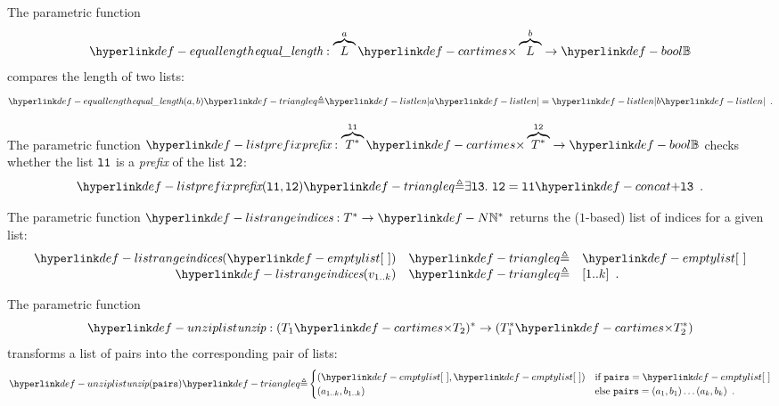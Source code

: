 \hypertarget{def-equallength}{}
\begin{definition}
The parametric function
\[
  \equallength : \overname{L}{a} \cartimes \overname{L}{b} \rightarrow \Bool
\]
compares the length of two lists:
\[
\equallength(a, b) \triangleq \listlen{a}=\listlen{b} \enspace.
\]
\end{definition}

\hypertarget{def-listprefix}{}
\begin{definition}
The parametric function $\listprefix : \overname{T^*}{\vlone} \cartimes \overname{T^*}{\vltwo} \rightarrow \Bool$ checks whether
the list $\texttt{l1}$ is a \emph{prefix} of the list $\texttt{l2}$:
\[
\listprefix(\vlone, \vltwo) \triangleq \exists \vlthree.\ \vltwo = \vlone \concat \vlthree \enspace.
\]
\end{definition}

\hypertarget{def-listrange}{}
\begin{definition}
The parametric function $\listrange : T^* \rightarrow \N^*$ returns the ($1$-based) list of indices for a given list:
\[
    \begin{array}{rcl}
        \listrange(\emptylist) &\triangleq& \emptylist\\
        \listrange(v_{1..k}) &\triangleq& [1..k] \enspace.
    \end{array}
\]
\end{definition}


\hypertarget{def-unziplist}{}
\begin{definition}
The parametric function
\[
\unziplist : (T_1 \cartimes T_2)^* \rightarrow (T_1^* \cartimes T_2^*)
\]
transforms a list of pairs into the corresponding pair of lists:
\[
  \unziplist(\pairs) \triangleq \begin{cases}
    (\emptylist, \emptylist)  & \text{if }\pairs = \emptylist\\
    (a_{1..k}, b_{1..k})      & \text{else }\pairs = (a_1,b_1) \ldots (a_k,b_k)  \enspace.
  \end{cases}
\]
\end{definition}


